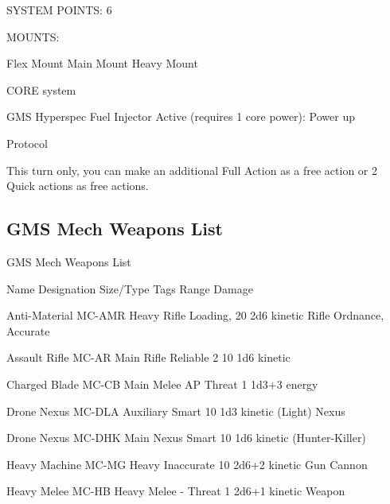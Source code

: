                                                  SYSTEM POINTS: 6 

                                                                                                                       


                                                 MOUNTS: 

Flex Mount                        Main Mount                            Heavy Mount 

                                              CORE system 

                                      GMS Hyperspec Fuel Injector  
Active (requires 1 core power): Power up
 
Protocol
 
This turn only, you can make an additional Full Action as a free action or 2 Quick actions as free  
actions. 
\subsection{GMS Mech Weapons List}
                                   GMS Mech Weapons List  

Name                 Designation        Size/Type        Tags                Range          Damage 

Anti-Material        MC-AMR             Heavy Rifle       Loading,            20            2d6 kinetic 
Rifle                                                     Ordnance,  
                                                        Accurate 

Assault Rifle         MC-AR              Main Rifle        Reliable 2          10             1d6 kinetic 

Charged Blade        MC-CB              Main Melee      AP                  Threat 1        1d3+3 energy 

Drone Nexus          MC-DLA             Auxiliary        Smart               10             1d3 kinetic 
(Light)                                 Nexus 

Drone Nexus          MC-DHK             Main Nexus       Smart               10             1d6 kinetic 
(Hunter-Killer) 

Heavy Machine        MC-MG              Heavy            Inaccurate          10            2d6+2 kinetic 
Gun                                     Cannon 

Heavy Melee          MC-HB              Heavy Melee      -                  Threat 1       2d6+1 kinetic 
Weapon 

